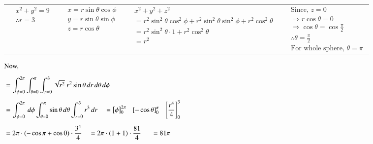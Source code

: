 \documentclass[11pt]{extarticle}
\newcommand{\dr}{{\,dr}}
\newcommand{\dtheta}{{\,d\theta}}
\newcommand{\dphi}{{\,d\phi}}
\begin{document}
\vspace{-\baselineskip}
\begin{tabularx}{\textwidth}{p{2.5cm}|p{3cm}|X|p{4.2cm}}
   $\begin{aligned}
      & x^2+y^2=9 \\
      & \therefore r=3 \\
   \end{aligned}$
   &
   $\begin{aligned}
      & x=r \sin \theta \cos \phi \\
      & y=r \sin \theta \sin \phi \\
      & z=r \cos \theta
   \end{aligned}$
   &
   $\begin{aligned}
      & x^2+y^2+z^2\\
      & = r^2\sin^2\theta\cos^2\phi+r^2\sin^2\theta\sin^2\phi+r^2\cos^2\theta\\
      & = r^2\sin^2\theta\cdot 1+r^2\cos^2\theta\\
      & = r^2
   \end{aligned}$
   &
   $\begin{aligned}
      &\text{Since, \ } z = 0\\
      & \Rightarrow r\cos\theta = 0\\
      & \Rightarrow \cos\theta = \cos\frac{\pi}{2}\\
      & \therefore \theta = \frac{\pi}{2}\\
      & \text{For whole sphere, } \theta=\pi
   \end{aligned}$
\end{tabularx}

$\begin{aligned}
& \text {Now, }\\[1ex]
& =\int_{\phi=0}^{2 \pi} \int_{\theta=0}^\pi \int_{r=0}^3 \sqrt{r^2} \ r^{2}\sin\theta \dr\dtheta\dphi \\[1ex]
& =\int_{\phi=0}^{2 \pi} \dphi 
\int_{\theta=0}^\pi \sin \theta \dtheta
\int_{r=0}^3 r^3 \dr 
\quad =\left[\phi\right]_0^{2 \pi} \tab
\left[-\cos \theta\right]_0^\pi \tab
\left[\frac{r^4}{4}\right]_0^3 \\[1ex]
& =2 \pi \cdot(-\cos \pi+\cos 0) \cdot \frac{3^4}{4}
\quad =2 \pi \cdot(1+1) \cdot \frac{81}{4} \tabs =81 \pi
\end{aligned}$

\end{document}
